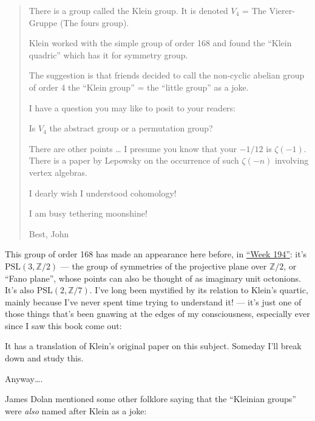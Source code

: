\documentclass{article}
\def\tightlist{}
\renewcommand{\texttt}[1]{%
  \begingroup
  \ttfamily
  \begingroup\lccode`~=`/\lowercase{\endgroup\def~}{/\discretionary{}{}{}}%
  \begingroup\lccode`~=`[\lowercase{\endgroup\def~}{[\discretionary{}{}{}}%
  \begingroup\lccode`~=`.\lowercase{\endgroup\def~}{.\discretionary{}{}{}}%
  \catcode`/=\active\catcode`[=\active\catcode`.=\active
  \scantokens{#1\noexpand}%
  \endgroup
}
\begin{document}
\begin{quote}
There is a group called the Klein group. It is denoted \(V_4\) = The
Vierer-Gruppe (The fours group).

Klein worked with the simple group of order 168 and found the ``Klein
quadric'' which has it for symmetry group.

The suggestion is that friends decided to call the non-cyclic abelian
group of order 4 the ``Klein group'' = the ``little group'' as a joke.

I have a question you may like to posit to your readers:

Is \(V_4\) the abstract group or a permutation group?

There are other points \ldots{} I presume you know that your \(-1/12\)
is \(\zeta(-1)\). There is a paper by Lepowsky on the occurrence of such
\(\zeta(-n)\) involving vertex algebras.

I dearly wish I understood cohomology!

I am busy tethering moonshine!

Best, John
\end{quote}

This group of order 168 has made an appearance here before, in
\protect\hyperlink{week194}{``Week 194''}: it's
\(\mathrm{PSL}(3,\mathbb{Z}/2)\) --- the group of symmetries of the
projective plane over \(\mathbb{Z}/2\), or ``Fano plane'', whose points
can also be thought of as imaginary unit octonions. It's also
\(\mathrm{PSL}(2,\mathbb{Z}/7)\). I've long been mystified by its
relation to Klein's quartic, mainly because I've never spent time trying
to understand it! --- it's just one of those things that's been gnawing
at the edges of my consciousness, especially ever since I saw this book
come out:


It has a translation of Klein's original paper on this subject. Someday
I'll break down and study this.

Anyway\ldots.

James Dolan mentioned some other folklore saying that the ``Kleinian
groups'' were \emph{also} named after Klein as a joke:
\end{document}
